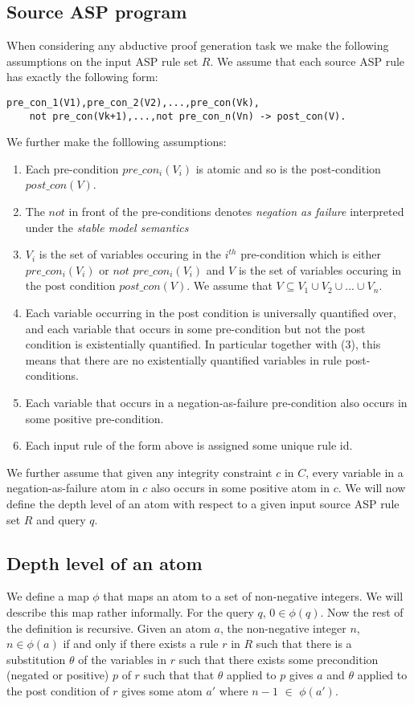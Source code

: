 \subsection{Source ASP program}

When considering any abductive proof generation task we make the following assumptions on the input ASP rule set $R$. We assume that each source ASP rule has exactly the following form:
\begin{lstlisting}[frame=none]
pre_con_1(V1),pre_con_2(V2),...,pre_con(Vk),
    not pre_con(Vk+1),...,not pre_con_n(Vn) -> post_con(V).
\end{lstlisting}
We further make the folllowing assumptions:

\begin{enumerate}
    \item Each pre-condition $pre\_con_{i}(V_{i})$ is atomic and so is the post-condition $post\_con(V)$.
    \item The $not$ in front of the pre-conditions denotes \textit{negation as failure} interpreted under the \textit{stable model semantics}
    \item $V_{i}$ is the set of variables occuring in the $i^{th}$ pre-condition which is either $pre\_con_{i}(V_{i})$ or $not$ $pre\_con_{i}(V_{i})$ and $V$ is the set of variables occuring in the post condition $post\_con(V)$. We assume that $V\subseteq V_{1}\cup V_{2}\cup ... \cup V_{n}$.
    \item Each variable occurring in the post condition is universally quantified over, and each variable that occurs in some pre-condition but not the post condition is existentially quantified. In particular together with (3), this means that there are no existentially quantified variables in rule post-conditions.
    \item Each variable that occurs in a negation-as-failure pre-condition also occurs in some positive pre-condition.
    \item Each input rule of the form above is assigned some unique rule id.
\end{enumerate}

We further assume that given any integrity constraint $c$ in $C$, every variable in a negation-as-failure atom in $c$ also occurs in some positive atom in $c$. We will now define the depth level of an atom with respect to a given input source ASP rule set $R$ and query $q$.

\subsection{Depth level of an atom}
We define a map $\phi$ that maps an atom to a set of non-negative integers. We
will describe this map rather informally. For the query $q$, $0\in
\phi(q)$. Now the rest of the definition is recursive. Given an atom $a$, the
non-negative integer $n$, $n\in \phi(a)$ if and only if there exists a rule
$r$ in $R$ such that there is a substitution $\theta$ of the variables in $r$
such that there exists some precondition (negated or positive) $p$ of $r$ such
that that $\theta$ applied to $p$ gives $a$ and $\theta$ applied to the post
condition of $r$ gives some atom $a'$ where $n-1$ $\in$ $\phi(a')$.

